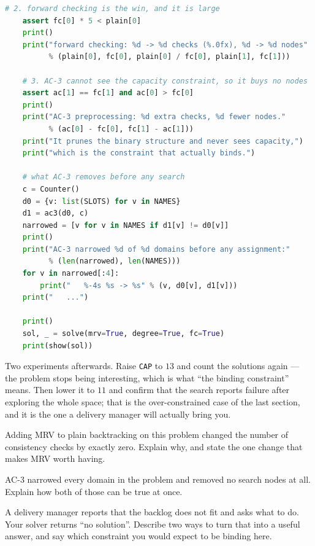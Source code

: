 \begin{lab}
\begin{lstlisting}[language=Python]
    # 2. forward checking is the win, and it is large
    assert fc[0] * 5 < plain[0]
    print()
    print("forward checking: %d -> %d checks (%.0fx), %d -> %d nodes"
          % (plain[0], fc[0], plain[0] / fc[0], plain[1], fc[1]))

    # 3. AC-3 cannot see the capacity constraint, so it buys no nodes
    assert ac[1] == fc[1] and ac[0] > fc[0]
    print()
    print("AC-3 preprocessing: %d extra checks, %d fewer nodes."
          % (ac[0] - fc[0], fc[1] - ac[1]))
    print("It prunes the binary structure and never sees capacity,")
    print("which is the constraint that actually binds.")

    # what AC-3 removes before any search
    c = Counter()
    d0 = {v: list(SLOTS) for v in NAMES}
    d1 = ac3(d0, c)
    narrowed = [v for v in NAMES if d1[v] != d0[v]]
    print()
    print("AC-3 narrowed %d of %d domains before any assignment:"
          % (len(narrowed), len(NAMES)))
    for v in narrowed[:4]:
        print("   %-4s %s -> %s" % (v, d0[v], d1[v]))
    print("   ...")

    print()
    sol, _ = solve(mrv=True, degree=True, fc=True)
    print(show(sol))
\end{lstlisting}
Two experiments afterwards. Raise \texttt{CAP} to $13$ and count the solutions
again --- the problem stops being interesting, which is what ``the binding
constraint'' means. Then lower it to $11$ and confirm that the search reports
failure after exploring the whole space; that is the over-constrained case of the
last section, and it is the one a delivery manager will actually bring you.
\end{lab}

\begin{checkpoint}
\begin{tightnum}
  \item Adding MRV to plain backtracking on this problem changed the number of
        consistency checks by exactly zero. Explain why, and state the one change
        that makes MRV worth having.
  \item AC-3 narrowed every domain in the problem and removed no search nodes at
        all. Explain how both of those can be true at once.
  \item A delivery manager reports that the backlog does not fit and asks what to
        do. Your solver returns ``no solution''. Describe two ways to turn that
        into a useful answer, and say which constraint you would expect to be
        binding here.
\end{tightnum}
\end{checkpoint}

